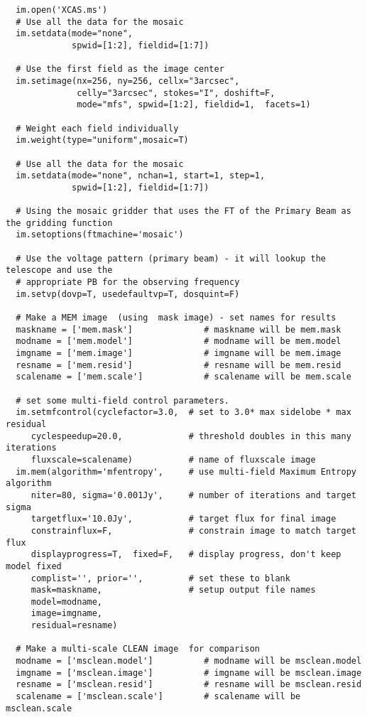 \begin{verbatim}
  im.open('XCAS.ms')
  # Use all the data for the mosaic
  im.setdata(mode="none",
             spwid=[1:2], fieldid=[1:7])

  # Use the first field as the image center
  im.setimage(nx=256, ny=256, cellx="3arcsec",
              celly="3arcsec", stokes="I", doshift=F,
              mode="mfs", spwid=[1:2], fieldid=1,  facets=1)

  # Weight each field individually
  im.weight(type="uniform",mosaic=T)

  # Use all the data for the mosaic
  im.setdata(mode="none", nchan=1, start=1, step=1,
             spwid=[1:2], fieldid=[1:7])

  # Using the mosaic gridder that uses the FT of the Primary Beam as the gridding function
  im.setoptions(ftmachine='mosaic')

  # Use the voltage pattern (primary beam) - it will lookup the telescope and use the
  # appropriate PB for the observing frequency
  im.setvp(dovp=T, usedefaultvp=T, dosquint=F)

  # Make a MEM image  (using  mask image) - set names for results
  maskname = ['mem.mask']              # maskname will be mem.mask
  modname = ['mem.model']              # modname will be mem.model
  imgname = ['mem.image']              # imgname will be mem.image
  resname = ['mem.resid']              # resname will be mem.resid
  scalename = ['mem.scale']            # scalename will be mem.scale

  # set some multi-field control parameters.
  im.setmfcontrol(cyclefactor=3.0,  # set to 3.0* max sidelobe * max residual
     cyclespeedup=20.0,             # threshold doubles in this many iterations
     fluxscale=scalename)           # name of fluxscale image
  im.mem(algorithm='mfentropy',     # use multi-field Maximum Entropy algorithm
     niter=80, sigma='0.001Jy',     # number of iterations and target sigma
     targetflux='10.0Jy',           # target flux for final image
     constrainflux=F,               # constrain image to match target flux
     displayprogress=T,  fixed=F,   # display progress, don't keep model fixed
     complist='', prior='',         # set these to blank
     mask=maskname,                 # setup output file names
     model=modname,
     image=imgname,
     residual=resname)

  # Make a multi-scale CLEAN image  for comparison
  modname = ['msclean.model']          # modname will be msclean.model
  imgname = ['msclean.image']          # imgname will be msclean.image
  resname = ['msclean.resid']          # resname will be msclean.resid
  scalename = ['msclean.scale']        # scalename will be msclean.scale


\end{verbatim}
